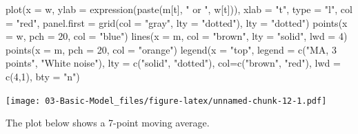 \documentclass[
]{book}
\newenvironment{Shaded}{\begin{snugshade}}{\end{snugshade}}
\newcommand{\AttributeTok}[1]{\textcolor[rgb]{0.77,0.63,0.00}{#1}}
\newcommand{\DecValTok}[1]{\textcolor[rgb]{0.00,0.00,0.81}{#1}}
\newcommand{\FunctionTok}[1]{\textcolor[rgb]{0.00,0.00,0.00}{#1}}
\newcommand{\NormalTok}[1]{#1}
\newcommand{\StringTok}[1]{\textcolor[rgb]{0.31,0.60,0.02}{#1}}
\theoremstyle{definition}
\theoremstyle{definition}
\theoremstyle{definition}
\theoremstyle{definition}
\theoremstyle{remark}
\begin{document}
\begin{Shaded}
\begin{Highlighting}[]
\FunctionTok{plot}\NormalTok{(}\AttributeTok{x =}\NormalTok{ w, }\AttributeTok{ylab =} \FunctionTok{expression}\NormalTok{(}\FunctionTok{paste}\NormalTok{(m[t], }\StringTok{" or "}\NormalTok{, w[t])), }
    \AttributeTok{xlab =} \StringTok{"t"}\NormalTok{, }\AttributeTok{type =} \StringTok{"l"}\NormalTok{, }\AttributeTok{col =} \StringTok{"red"}\NormalTok{, }\AttributeTok{panel.first =} 
    \FunctionTok{grid}\NormalTok{(}\AttributeTok{col =} \StringTok{"gray"}\NormalTok{, }\AttributeTok{lty =} \StringTok{"dotted"}\NormalTok{), }\AttributeTok{lty =} \StringTok{"dotted"}\NormalTok{)}
\FunctionTok{points}\NormalTok{(}\AttributeTok{x =}\NormalTok{ w, }\AttributeTok{pch =} \DecValTok{20}\NormalTok{, }\AttributeTok{col =} \StringTok{"blue"}\NormalTok{)}
\FunctionTok{lines}\NormalTok{(}\AttributeTok{x =}\NormalTok{ m, }\AttributeTok{col =} \StringTok{"brown"}\NormalTok{, }\AttributeTok{lty =} \StringTok{"solid"}\NormalTok{, }\AttributeTok{lwd =} \DecValTok{4}\NormalTok{)}
\FunctionTok{points}\NormalTok{(}\AttributeTok{x =}\NormalTok{ m, }\AttributeTok{pch =} \DecValTok{20}\NormalTok{, }\AttributeTok{col =} \StringTok{"orange"}\NormalTok{)}
\FunctionTok{legend}\NormalTok{(}\AttributeTok{x =} \StringTok{"top"}\NormalTok{, }\AttributeTok{legend =} \FunctionTok{c}\NormalTok{(}\StringTok{"MA, 3 points"}\NormalTok{, }\StringTok{"White noise"}\NormalTok{), }\AttributeTok{lty =} \FunctionTok{c}\NormalTok{(}\StringTok{"solid"}\NormalTok{, }\StringTok{"dotted"}\NormalTok{), }\AttributeTok{col=}\FunctionTok{c}\NormalTok{(}\StringTok{"brown"}\NormalTok{, }
    \StringTok{"red"}\NormalTok{), }\AttributeTok{lwd =} \FunctionTok{c}\NormalTok{(}\DecValTok{4}\NormalTok{,}\DecValTok{1}\NormalTok{), }\AttributeTok{bty =} \StringTok{"n"}\NormalTok{)}
\end{Highlighting}
\end{Shaded}

\texttt{[image: 03-Basic-Model\_files/figure-latex/unnamed-chunk-12-1.pdf]}

The plot below shows a 7-point moving average.
\end{document}
